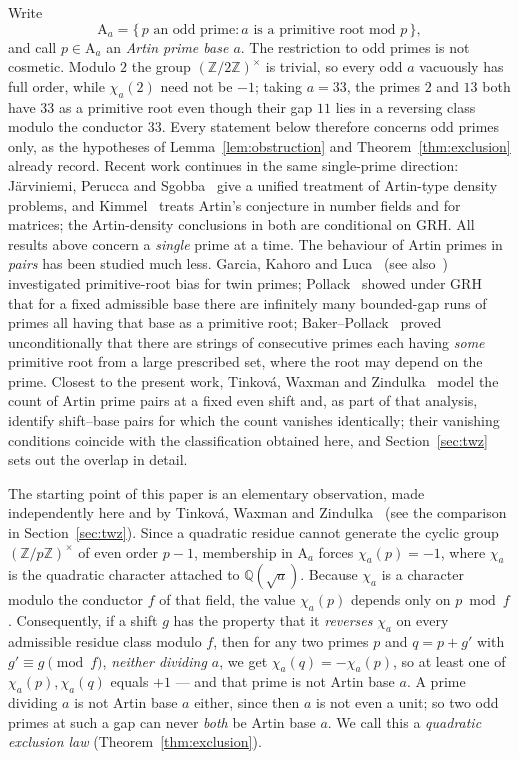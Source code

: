 \documentclass[11pt,reqno]{amsart}
\theoremstyle{plain}
\theoremstyle{definition}
\newcommand{\Art}{\mathrm{A}}
\newcommand{\Z}{\mathbb{Z}}
\newcommand{\Q}{\mathbb{Q}}
\begin{document}
Write
\[
  \Art_a = \{\, p \text{ an odd prime} : a \text{ is a primitive root mod } p \,\},
\]
and call $p \in \Art_a$ an \emph{Artin prime base $a$}. The restriction to odd
primes is not cosmetic. Modulo $2$ the group $(\Z/2\Z)^\times$ is trivial, so
every odd $a$ vacuously has full order, while $\chi_a(2)$ need not be $-1$;
taking $a = 33$, the primes $2$ and $13$ both have $33$ as a primitive root
even though their gap $11$ lies in a reversing class modulo the conductor
$33$. Every statement below therefore concerns odd primes only, as the
hypotheses of Lemma~\ref{lem:obstruction} and Theorem~\ref{thm:exclusion}
already record. Recent work continues in the same single-prime direction: J\"arviniemi,
Perucca and Sgobba~\cite{JarviniemiPeruccaSgobba2025} give a unified treatment
of Artin-type density problems, and Kimmel~\cite{Kimmel2024} treats Artin's
conjecture in number fields and for matrices; the Artin-density conclusions in
both are conditional on GRH. All results above
concern a \emph{single} prime at a time. The behaviour of Artin primes in
\emph{pairs} has been studied much less. Garcia, Kahoro and
Luca~\cite{GarciaKahoroLuca2019} (see also~\cite{GarciaLucaShiUdell2020})
investigated primitive-root bias for twin primes; Pollack~\cite{Pollack2014}
showed under GRH that for a fixed admissible base there are infinitely many
bounded-gap runs of primes all having that base as a primitive root;
Baker--Pollack~\cite{BakerPollack2016} proved unconditionally that there are
strings of consecutive primes each having \emph{some} primitive root from a
large prescribed set, where the root may depend on the prime. Closest to the
present work, Tinkov\'a, Waxman and Zindulka~\cite{TinkovaWaxmanZindulka2023}
model the count of Artin prime pairs at a fixed even shift and, as part of
that analysis, identify shift--base pairs for which the count vanishes
identically; their vanishing conditions coincide with the classification
obtained here, and Section~\ref{sec:twz} sets out the overlap in detail.

The starting point of this paper is an elementary observation, made
independently here and by Tinkov\'a, Waxman and
Zindulka~\cite{TinkovaWaxmanZindulka2023} (see the comparison in
Section~\ref{sec:twz}). Since a quadratic residue cannot generate the cyclic group
$(\Z/p\Z)^\times$ of even order $p - 1$, membership in $\Art_a$ forces
$\chi_a(p) = -1$, where $\chi_a$ is the quadratic character attached to
$\Q(\sqrt{a})$. Because $\chi_a$ is a character modulo the conductor $f$ of
that field, the value $\chi_a(p)$ depends only on $p \bmod f$. Consequently, if
a shift $g$ has the property that it \emph{reverses} $\chi_a$ on every
admissible residue class modulo $f$, then for any two primes $p$ and $q = p+g'$
with $g' \equiv g \pmod f$, \emph{neither dividing $a$}, we get
$\chi_a(q) = -\chi_a(p)$, so at least one of $\chi_a(p), \chi_a(q)$ equals
$+1$ --- and that prime is not Artin base $a$. A prime dividing $a$ is not
Artin base $a$ either, since then $a$ is not even a unit; so two odd primes at
such a gap can never \emph{both} be Artin base $a$. We call this
a \emph{quadratic exclusion law} (Theorem~\ref{thm:exclusion}).
\end{document}
